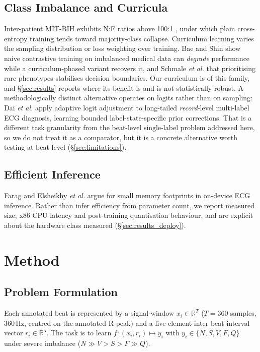 \documentclass[journal,twoside,web]{ieeecolor}
\begin{document}
\subsection{Class Imbalance and Curricula}
Inter-patient MIT-BIH exhibits N:F ratios above 100:1 \cite{silva_systematic_2025}, under which plain cross-entropy training tends toward majority-class collapse. Curriculum learning \cite{bengio_curriculum_2009} varies the sampling distribution or loss weighting over training. Bae and Shin \cite{bae_handling_2025} show naive contrastive training on imbalanced medical data can \emph{degrade} performance while a curriculum-phased variant recovers it, and Schmale \emph{et al.} \cite{schmale_curriculum_2025} that prioritising rare phenotypes stabilises decision boundaries. Our curriculum is of this family, and \S\ref{sec:results} reports where its benefit is and is not statistically robust. A methodologically distinct alternative operates on logits rather than on sampling: Dai \emph{et al.} \cite{dai_angular_2026} apply adaptive logit adjustment to long-tailed \emph{record}-level multi-label ECG diagnosis, learning bounded label-state-specific prior corrections. That is a different task granularity from the beat-level single-label problem addressed here, so we do not treat it as a comparator, but it is a concrete alternative worth testing at beat level (\S\ref{sec:limitations}).

\subsection{Efficient Inference}
Farag \cite{farag_tiny_2023} and Elsheikhy \emph{et al.} \cite{elsheikhy_lightweight_2025} argue for small memory footprints in on-device ECG inference. Rather than infer efficiency from parameter count, we report measured size, x86 CPU latency and post-training quantisation behaviour, and are explicit about the hardware class measured (\S\ref{sec:results_deploy}).

\section{Method}
\label{sec:methods}

\subsection{Problem Formulation}
Each annotated beat is represented by a signal window $x_i \in \mathbb{R}^{T}$ ($T=360$ samples, 360\,Hz, centred on the annotated R-peak) and a five-element inter-beat-interval vector $r_i \in \mathbb{R}^{5}$. The task is to learn $f:(x_i,r_i)\mapsto y_i$ with $y_i \in \{N,S,V,F,Q\}$ under severe imbalance ($N \gg V > S > F \gg Q$).
\end{document}
